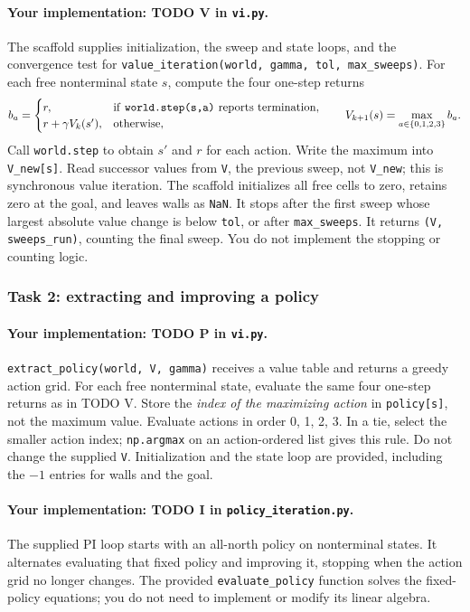 \documentclass[11pt]{article}
\begin{document}
\paragraph{Your implementation: TODO V in \texttt{vi.py}.}
The scaffold supplies initialization, the sweep and state loops, and
the convergence test for
\texttt{value\_iteration(world, gamma, tol, max\_sweeps)}.
For each free nonterminal state $s$, compute the four one-step returns
\[
b_a=\begin{cases}
r, & \text{if \texttt{world.step(s,a)} reports termination},\\
r+\gamma V_k(s'), & \text{otherwise},
\end{cases}
\qquad V_{k+1}(s)=\max_{a\in\{0,1,2,3\}} b_a.
\]
Call \texttt{world.step} to obtain $s'$ and $r$ for each action.
Write the maximum into \texttt{V\_new[s]}. Read successor values from
\texttt{V}, the previous sweep, not \texttt{V\_new}; this is synchronous
value iteration. The scaffold initializes all free cells to zero,
retains zero at the goal, and leaves walls as \texttt{NaN}.
It stops after the first sweep whose largest absolute value change is
below \texttt{tol}, or after \texttt{max\_sweeps}. It returns
\texttt{(V, sweeps\_run)}, counting the final sweep. You do not implement
the stopping or counting logic.

\clearpage
\subsubsection*{Task 2: extracting and improving a policy}
\paragraph{Your implementation: TODO P in \texttt{vi.py}.}
\texttt{extract\_policy(world, V, gamma)} receives a value table and
returns a greedy action grid. For each free nonterminal state, evaluate
the same four one-step returns as in TODO V. Store the \emph{index of
the maximizing action} in \texttt{policy[s]}, not the maximum value.
Evaluate actions in order 0, 1, 2, 3. In a tie, select the smaller
action index; \texttt{np.argmax} on an action-ordered list gives this
rule. Do not change the supplied \texttt{V}. Initialization and the state
loop are provided, including the $-1$ entries for walls and the goal.

\paragraph{Your implementation: TODO I in \texttt{policy\_iteration.py}.}
The supplied PI loop starts with an all-north policy on nonterminal
states. It alternates evaluating that fixed policy and improving it,
stopping when the action grid no longer changes. The provided
\texttt{evaluate\_policy} function solves the fixed-policy equations;
you do not need to implement or modify its linear algebra.
\end{document}
